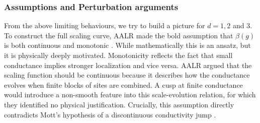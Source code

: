 \subsubsection*{Assumptions and Perturbation arguments}
From the above limiting behaviours, we try to build a picture for $d= 1, 2$ and $3$. To construct the full scaling curve, AALR made the bold assumption that $\beta(g)$ is both continuous and monotonic \cite{AALR1979}. While mathematically this is an ansatz, but it is physically deeply motivated. Monotonicity reflects the fact that small conductance implies stronger localization and vice versa. AALR argued that the scaling function should be continuous because it describes how the conductance evolves when finite blocks of sites are combined. A cusp at finite conductance would introduce a non-smooth feature into this scale-evolution relation, for which they identified no physical justification. Crucially, this assumption directly contradicts Mott's hypothesis of a discontinuous conductivity jump \cite{Mott1974}.


